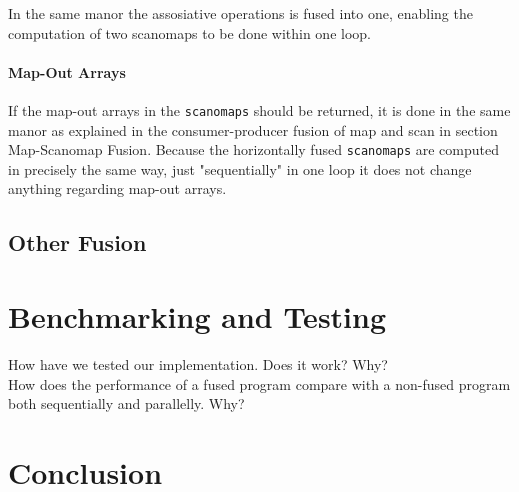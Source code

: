 \documentclass[11pt]{article}
\begin{document}
In the same manor the assosiative operations is fused into one, enabling the computation of two scanomaps to be done within one loop. 

\paragraph{Map-Out Arrays}
If the map-out arrays in the \texttt{scanomaps} should be returned, it is done in the same manor as explained in the consumer-producer fusion of map and scan in section Map-Scanomap Fusion. Because the horizontally fused \texttt{scanomaps} are computed in precisely the same way, just "sequentially" in one loop it does not change anything regarding map-out arrays.

\subsection{Other Fusion}





\section{Benchmarking and Testing}
How have we tested our implementation. Does it work? Why?\\
How does the performance of a fused program compare with a non-fused program both sequentially and parallelly. Why?

\section{Conclusion}
\newpage



\end{document}

